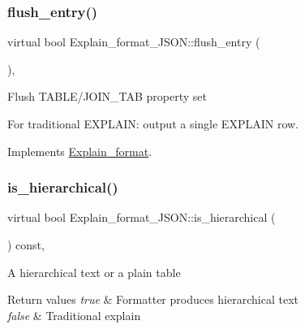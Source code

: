 \mbox{\label{classExplain__format__JSON_adf08f2f20ae05ca772a621f6139be6aa}} 
\subsubsection{\texorpdfstring{flush\+\_\+entry()}{flush\_entry()}}
{\footnotesize\ttfamily virtual bool Explain\+\_\+format\+\_\+\+J\+S\+O\+N\+::flush\+\_\+entry (\begin{DoxyParamCaption}{ }\end{DoxyParamCaption})\hspace{0.3cm}{\ttfamily [inline]}, {\ttfamily [virtual]}}

Flush T\+A\+B\+L\+E/\+J\+O\+I\+N\+\_\+\+T\+AB property set

For traditional E\+X\+P\+L\+A\+IN\+: output a single E\+X\+P\+L\+A\+IN row. 

Implements \mbox{\hyperlink{classExplain__format_a3907382576a43a2fa4ed554f5d13e158}{Explain\+\_\+format}}.

\mbox{\label{classExplain__format__JSON_a5df8ad340d44c6d184be5f6397ab8d99}} 
\subsubsection{\texorpdfstring{is\+\_\+hierarchical()}{is\_hierarchical()}}
{\footnotesize\ttfamily virtual bool Explain\+\_\+format\+\_\+\+J\+S\+O\+N\+::is\+\_\+hierarchical (\begin{DoxyParamCaption}{ }\end{DoxyParamCaption}) const\hspace{0.3cm}{\ttfamily [inline]}, {\ttfamily [virtual]}}

A hierarchical text or a plain table


\begin{DoxyRetVals}{Return values}
{\em true} & Formatter produces hierarchical text \\
\hline
{\em false} & Traditional explain \\
\hline
\end{DoxyRetVals}


